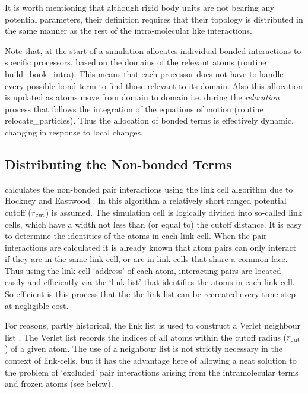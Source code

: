 It is worth mentioning that although rigid body
units are not bearing any potential parameters, their definition
requires that their topology is distributed in the same manner as
the rest of the intra-molecular like interactions.

Note that, at the start of a simulation \D allocates individual
bonded interactions to specific processors, based on the domains
of the relevant atoms (\D routine {\sc build\_book\_intra}).
This means that each processor does not have to handle every
possible bond term to find those relevant to its domain.  Also
this allocation is updated as atoms move from domain to domain
i.e. during the {\em relocation} process that follows the
integration of the equations of motion (\D routine {\sc
relocate\_particles}). Thus the allocation of bonded terms is
effectively dynamic, changing in response to local changes.

\subsection{Distributing the Non-bonded Terms}

\D calculates the non-bonded pair
interactions using the link cell algorithm due to Hockney and
Eastwood \cite{hockney-81a}.  In this algorithm a relatively short
ranged potential cutoff ($r_{\rm cut}$) is assumed.  The simulation cell
is logically divided into so-called link cells, which have a width
not less than (or equal to) the cutoff distance.  It is easy to
determine the identities of the atoms in each link cell.  When the
pair interactions are calculated it is already known that atom
pairs can only interact if they are in the same link cell, or are
in link cells that share a common face.  Thus using the link cell
`address' of each atom, interacting pairs are located easily and
efficiently via the `link list' that identifies the atoms in each
link cell.  So efficient is this process that the the link list
can be recreated every time step at negligible cost.

For reasons, partly historical, the link list is used to construct
a Verlet neighbour list
\cite{allen-89a}.  The Verlet list records the indices of all
atoms within the cutoff radius ($r_{\rm cut}$) of a given atom.  The
use of a neighbour list is not strictly necessary in the context
of link-cells, but it has the advantage here of allowing a neat
solution to the problem of `excluded' pair interactions arising
from the intramolecular terms and frozen atoms (see below).

